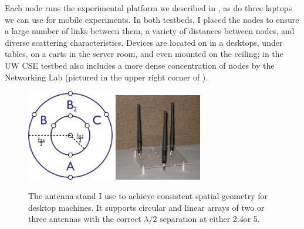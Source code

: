 Each node runs the experimental platform we described in , as do three laptops we can use for mobile experiments. In both testbeds, I placed the nodes to ensure a large number of links between them, a variety of distances between nodes, and diverse scattering characteristics. Devices are located on in a desktops, under tables, on a carts in the server room, and even mounted on the ceiling; in the UW CSE testbed also includes a more dense concentration of nodes by the Networking Lab (pictured in the upper right corner of ).

\begin{figure}[ht]
	\centering
	\includegraphics[width=1.5in]{figures/rpsma_dual_632_single_lines.pdf}%
	\hspace{1in}
	\includegraphics[height=1.5in,width=1.5in]{figures/antennas.jpg}
	\caption[A custom antenna stand used to achieve consistent spatial geometry]{\label{fig:antenna_stand}The antenna stand I use to achieve consistent spatial geometry for desktop machines. It supports circular and linear arrays of two or three antennas with the correct $\lambda/2$ separation at either 2.4\GHz or 5\GHz.}
\end{figure}
